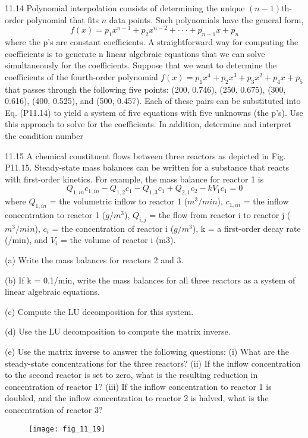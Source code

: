 \documentclass[../main.tex]{subfiles}
\begin{document}
11.14 Polynomial interpolation consists of determining the
unique $(n - 1)$th-order polynomial that fits $n$ data points.
Such polynomials have the general form,
\begin{equation}
f(x) = p_{1}x^{n-1} + p_{2}x^{n-2} +···+ p_{n-1}x + p_{n}
\tag{P11.14}
\end{equation}
where the p's are constant coefficients. A straightforward
way for computing the coefficients is to generate n linear
algebraic equations that we can solve simultaneously for
the coefficients. Suppose that we want to determine the
coefficients of the fourth-order polynomial $f (x) = p_{1}x^{4} +
p_{2}x^{3} + p_{3}x^{2} + p_{4}x + p_{5}$ that passes through the following five
points: (200, 0.746), (250, 0.675), (300, 0.616), (400, 0.525),
and (500, 0.457). Each of these pairs can be substituted into
Eq. (P11.14) to yield a system of five equations with five
unknowns (the p's). Use this approach to solve for the coefficients. In addition, determine and interpret the condition
number


11.15 A chemical constituent flows between three reactors
as depicted in Fig. P11.15. Steady-state mass balances can
be written for a substance that reacts with first-order kinetics. For example, the mass balance for reactor 1 is
\begin{equation}
Q_{1,in}c_{1,in} - Q_{1,2}c_{1} - Q_{1,3}c_{1} + Q_{2,1}c_{2} - kV_{1}c_{1} = 0
\tag{P11.15}
\end{equation}
where $Q_{1,in}$ = the volumetric inflow to reactor 1 ($m^{3}/min$),
$c_{1,in}$ = the inflow concentration to reactor 1 ($g/m^{3}$), $Q_{i,j}$ = the flow from reactor i to reactor j ($m^{3}/min$), $c_{i}$ = the concentration of reactor i ($g/m^{3}$), k = a first-order decay rate (/min),
and $V_{i}$ = the volume of reactor i (m3). 

(a) Write the mass balances for reactors 2 and 3.

(b) If k = 0.1/min, write the mass balances for all three
reactors as a system of linear algebraic equations.

(c) Compute the LU decomposition for this system.

(d) Use the LU decomposition to compute the matrix inverse.

(e) Use the matrix inverse to answer the following questions: (i) What are the steady-state concentrations for
the three reactors? (ii) If the inflow concentration to the
second reactor is set to zero, what is the resulting
reduction in concentration of reactor 1? (iii) If the inflow concentration to reactor 1 is doubled, and the inflow concentration to reactor 2 is halved, what is the concentration of reactor 3?
\begin{figure}[H]
	\centering
	\texttt{[image: fig\_11\_19]}
	\label{fig:fig_11_19}
\end{figure}
\end{document}
